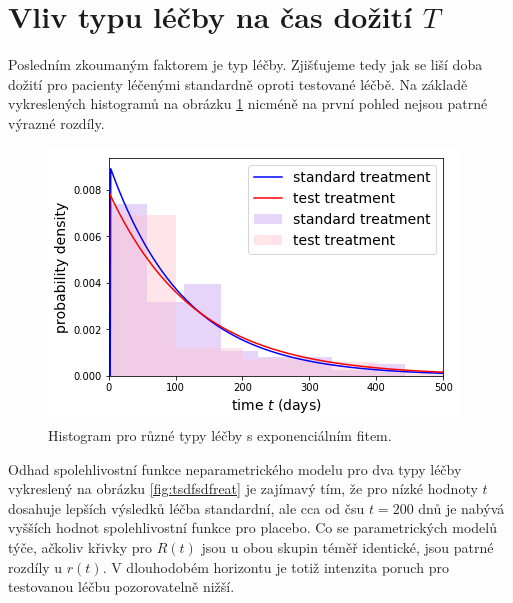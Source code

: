 \documentclass[10pt]{article}
\begin{document}
\section{Vliv typu léčby na čas dožití $T$}
Posledním zkoumaným faktorem je typ léčby. Zjišťujeme tedy jak se liší doba dožití pro pacienty léčenými standardně oproti testované léčbě. Na základě vykreslených histogramů na obrázku \ref{fig:trcxveat} nicméně na první pohled nejsou patrné výrazné rozdíly.
  \begin{figure}[htb!]
\centering 
    \includegraphics[width=.6\textwidth]{Images/treat/histexp.png}
  \caption{Histogram pro různé typy léčby s exponenciálním fitem.}\label{fig:trcxveat} 
  \end{figure}
Odhad spolehlivostní funkce neparametrického modelu pro dva typy léčby vykreslený na obrázku \ref{fig:tsdfsdfreat} je zajímavý tím, že pro nízké hodnoty $t$ dosahuje lepších výsledků léčba standardní, ale cca od čsu $t = 200$ dnů je nabývá vyšších hodnot spolehlivostní funkce pro placebo. Co se parametrických modelů týče, ačkoliv křivky pro $R(t)$ jsou u obou skupin téměř identické, jsou patrné rozdíly u $r(t)$. V dlouhodobém horizontu je totiž intenzita poruch pro testovanou léčbu pozorovatelně nižší.
\end{document}
